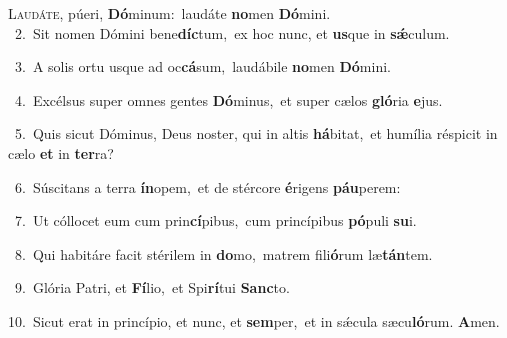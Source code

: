 \lettrine{\initial\textcolor{\initialcolor}{L}}{audáte,} púeri, \textbf{Dó}\-minum:~\star laudáte \textbf{no}\-men \textbf{Dó}\-mini.\\
{\numbfont\textcolor{\numbcolor}{~2.}}~Sit nomen Dómini bene\-\textbf{díc}\-tum,~\star ex hoc nunc, et \textbf{us}\-que in \textbf{sǽ}\-culum.\par
{\numbfont\textcolor{\numbcolor}{~3.}}~A solis ortu usque ad oc\-\textbf{cá}\-sum,~\star laudábile \textbf{no}\-men \textbf{Dó}\-mini.\par
{\numbfont\textcolor{\numbcolor}{~4.}}~Excélsus super omnes gentes \textbf{Dó}\-minus,~\star et super cælos \textbf{gló}\-ria \textbf{e}\-jus.\par
{\numbfont\textcolor{\numbcolor}{~5.}}~Quis sicut Dóminus, Deus noster, qui in altis \textbf{há}\-bitat,~\star et humília réspicit in cælo \textbf{et} in \textbf{ter}\-ra?\par
{\numbfont\textcolor{\numbcolor}{~6.}}~Súscitans a terra \textbf{ín}\-opem,~\star et de stércore \textbf{é}\-rigens \textbf{páu}\-perem:\par
{\numbfont\textcolor{\numbcolor}{~7.}}~Ut cóllocet eum cum prin\-\textbf{cí}\-pibus,~\star cum princípibus \textbf{pó}\-puli \textbf{su}\-i.\par
{\numbfont\textcolor{\numbcolor}{~8.}}~Qui habitáre facit stérilem in \textbf{do}\-mo,~\star matrem fili\-\textbf{ó}\-rum læ\-\textbf{tán}\-tem.\par
{\numbfont\textcolor{\numbcolor}{~9.}}~Glória Patri, et \textbf{Fí}\-lio,~\star et Spi\-\textbf{rí}\-tui \textbf{Sanc}\-to.\par
{\numbfont\textcolor{\numbcolor}{10.}}~Sicut erat in princípio, et nunc, et \textbf{sem}\-per,~\star et in sǽcula sæcu\-\textbf{ló}\-rum. \textbf{A}\-men.\par
